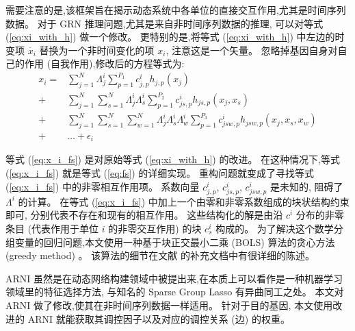 需要注意的是,该框架旨在揭示动态系统中各单位的直接交互作用,尤其是时间序列数据。
对于 GRN 推理问题,尤其是来自非时间序列数据的推理,
可以对等式 (\ref{eq:xi_with_h}) 做一个修改。
更特别的是,将等式 (\ref{eq:xi_with_h}) 中左边的时变项 $\dot{x_i}$ 替换为一个非时间变化的项 $x_i$, 注意这是一个矢量。
忽略掉基因自身对自己的作用 (自我作用),修改后的方程等式为:
\begin{equation}
\label{eq:x_i_fs}
\begin{split}
   x_i = &\sum_{j=1}^{N} \Lambda^i_{j} \sum_{p=1}^{P_1} c^i_{j,p}h_{j,p}(x_j)\\ 
       + &\sum_{j=1}^{N} \sum_{s=1}^{N}\Lambda^i_{j}\Lambda^i_{s} \sum_{p=1}^{P_2} c^i_{js,p}h_{js,p}(x_j,x_s) \\ 
       + &\sum_{j=1}^{N} \sum_{s=1}^{N} \sum_{w=1}^{N}\Lambda^i_{j}\Lambda^i_{s}\Lambda^i_{w} \sum_{p=1}^{P_3} c^i_{jsw,p}h_{jsw,p}(x_j,x_s,x_w)\\
       +&\ldots + \epsilon_{i}
   \end{split}
\end{equation}

等式 (\ref{eq:x_i_fs}) 是对原始等式 (\ref{eq:xi_with_h}) 的改进。
在这种情况下,等式 (\ref{eq:x_i_fs}) 就是等式 (\ref{eq:fs}) 的详细实现。
重构问题就变成了寻找等式 (\ref{eq:x_i_fs}) 中的非零相互作用项。
系数向量 $c^i_{j,p}$, $c^i_{js,p}$, $c^i_{jsw,p}$ 是未知的,
阻碍了 $\Lambda^i$ 的计算。
在等式 (\ref{eq:x_i_fs}) 中加上一个由零和非零系数组成的块状结构约束即可,
分别代表不存在和现有的相互作用。
这些结构化的解是由沿 $c^i$ 分布的非零条目 (代表作用于单位 $i$ 的非零交互作用) 的块 $c^i_s$ 构成的。
为了解决这个数学分组变量的回归问题,本文使用一种基于块正交最小二乘 (BOLS) 算法的贪心方法 (greedy method) 。
该算法的细节在文献  的补充文档中有很详细的陈述。

ARNI 虽然是在动态网络构建领域中被提出来,在本质上可以看作是一种机器学习领域里的特征选择方法,
与知名的 Sparse Group Lasso  有异曲同工之处。
本文对 ARNI 做了修改,使其在非时间序列数据一样适用。
针对于目的基因, 本文使用改进的 ARNI 就能获取其调控因子以及对应的调控关系 (边) 的权重。

